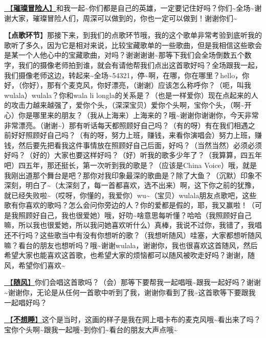 \documentclass[]{ctexbook}
\begin{document}
\hyperref[adventurers]{🎵【\textbf{璀璨冒险人}】}和我一起\textasciitilde 你们都是自己的英雄，一定要记住好吗？你们\textasciitilde 全场\textasciitilde 谢谢大家，璀璨冒险人们，周深可以做到的，你也一定可以做到！谢谢你们\textasciitilde{}

【\textbf{点歌环节}】那接下来，到我们的点歌环节哦，我的这个歌单非常考验到底听我的歌听了多久，因为它是相对来说，比较宝藏歌单的一些歌曲，但是我相信这些歌会是某一个人他心中的宝藏歌曲，对吗？谢谢谢谢\textasciitilde 那等下我们会全场倒数五个数字，我们的摄像老师拍到谁，就会有请他帮我们点出这首歌好吗？全场跟我一起，我们摄像老师这边，转起来\textasciitilde 全场\textasciitilde54321，停\textasciitilde 啊，在哪，你在哪里？hello，你好，（你好），那有个麦克风，你好漂亮，（谢谢）应该怎么称呼你？（呃，叫我wulala）wulala？你和wala li longla的关系是？（也是一样爱你）现在点起来的人的攻击力越来越强了，爱你个头，（深深宝贝）爱你个头啊，宝你个头，（啊\textasciitilde 开心）你是哪里来的朋友？（我从上海来）上海来的？哦\textasciitilde 谢谢你谢谢你，今天非常非常漂亮。（谢谢\textasciitilde）那有听话每天都照顾好自己吗？（有的呀）有在我们相遇之前好好照顾好自己吗？（有的呀，努力上班，赚钱，来看你演唱会）努力上班，赚钱，然后要先把看我这件事情放在照顾好自己后面，好吗？（当然当然）必须必须好吗？（好的）大家也要这样好吗？（好）听我的歌多少年了？（我算算，四五年吧）四五年，那还挺长，第一次听到我的歌是？（应该是China Voice）哦，就是我刚出道那个舞台是吧？那你对我印象最深的歌曲是？除了大鱼？（沉默）印象不深刻，明白了\textasciitilde（太深刻了，每一首都喜欢，选不出来）啊，这下你之前的犹豫，就已经失败啦\textasciitilde（哎呀，你懂的，我爱你）wu\textasciitilde（宝贝）wulala朋友点歌吧，这些歌有你喜欢的歌吗？怎么会问你旁边的人？你的爱都是假的，耶，我又赢啦！（可是我照顾好自己，我也很爱她）哦，好叻\textasciitilde 啥意思每听懂？哈哈（我照顾好自己嘛，所以我也很爱她，所以我问她喜欢听什么）真棒，我说不过你，我错了，我唱还不行吗？这些歌当中有没有你想听的歌？（我想听随风）哇塞，大家都想听随风嘛？看台的朋友也想听吗？哦\textasciitilde 谢谢wulala，谢谢你，我也很喜欢这首随风，然后希望大家也能喜欢这首歌，也希望大家的烦恼都可以随风被吹走好吗？谢谢，随风，希望你们喜欢\textasciitilde{}

\hyperref[with-wind]{🎵【\textbf{随风}】}你们会唱这首歌吗？（会）那等下要帮我一起唱哦\textasciitilde 跟我一起好吗？谢谢\textasciitilde 谢谢你，无论是从任何一首歌中听到了我，谢谢你看到了我\textasciitilde 这首歌等下要跟我一起唱好吗？

\hyperref[donot-want-to-sleep]{🎵【\textbf{不想睡}】}这个是当时，这画的样子是我在网上唱卡布的麦克风哦\textasciitilde 看出来了吗？宝你个头啊\textasciitilde 跟我一起哦\textasciitilde 到你们\textasciitilde 看台的朋友大声点哦\textasciitilde{}
\end{document}
